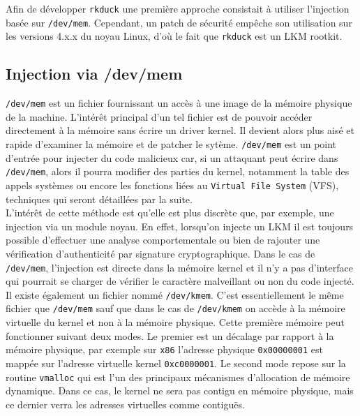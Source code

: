 \documentclass[12pt]{article}
\begin{document}
    Afin de développer \texttt{rkduck} une première approche consistait à utiliser l'injection basée sur \texttt{/dev/mem}. Cependant, un patch de sécurité empêche son utilisation sur les versions 4.x.x du noyau Linux, d'où le fait que \texttt{rkduck} est un LKM rootkit.

    \subsection{Injection via /dev/mem}
    
        \texttt{/dev/mem} est un fichier fournissant un accès à une image de la mémoire physique de la machine. L'intérêt principal d'un tel fichier est de pouvoir accéder directement à la mémoire sans écrire un driver kernel. Il devient alors plus aisé et rapide d'examiner la mémoire et de patcher le sytème. \texttt{/dev/mem} est un point d'entrée pour injecter du code malicieux\cite{devmen}\cite{hackin9}\cite{sstic} car, si un attaquant peut écrire dans \texttt{/dev/mem}, alors il pourra modifier des parties du kernel, notamment la table des appels systèmes ou encore les fonctions liées au \texttt{Virtual File System} (VFS), techniques qui seront détaillées par la suite.\\
        
        L'intérêt de cette méthode est qu'elle est plus discrète que, par exemple, une injection via un module noyau. En effet, lorsqu'on injecte un LKM il est toujours possible d'effectuer une analyse comportementale ou bien de rajouter une vérification d'authenticité par signature cryptographique. Dans le cas de \texttt{/dev/mem}, l'injection est directe dans la mémoire kernel et il n'y a pas d'interface qui pourrait se charger de vérifier le caractère malveillant ou non du code injecté.\\
        
        Il existe également un fichier nommé \texttt{/dev/kmem}\cite{devkmem}. C'est essentiellement le même fichier que \texttt{/dev/mem} sauf que dans le cas de \texttt{/dev/kmem} on accède à la mémoire virtuelle du kernel et non à la mémoire physique. Cette première mémoire peut fonctionner suivant deux modes. Le premier est un décalage par rapport à la mémoire physique, par exemple sur \texttt{x86} l'adresse physique \texttt{0x00000001} est mappée sur l'adresse virtuelle kernel \texttt{0xc0000001}. Le second mode repose sur la routine \texttt{vmalloc} qui est l'un des principaux mécanismes d'allocation de mémoire dynamique. Dans ce cas, le kernel ne sera pas contigu en mémoire physique, mais ce dernier verra les adresses virtuelles comme contiguës.\\
        
\end{document}
